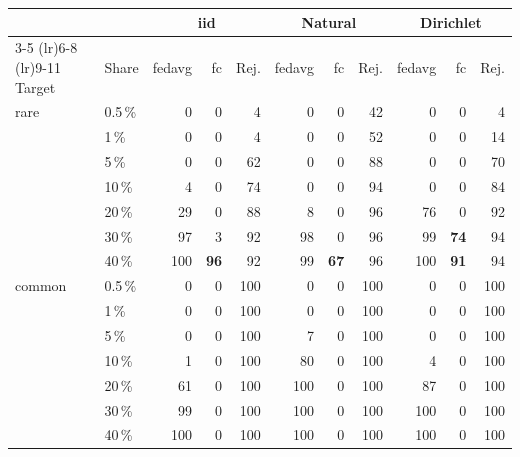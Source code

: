 \begin{tabular}{llrrrrrrrrr}
\toprule
 & & \multicolumn{3}{c}{\gls{iid}} & \multicolumn{3}{c}{Natural} & \multicolumn{3}{c}{Dirichlet} \\
\cmidrule(lr){3-5} \cmidrule(lr){6-8} \cmidrule(lr){9-11}
Target & Share & \gls{fedavg} & \gls{fc} & Rej. & \gls{fedavg} & \gls{fc} & Rej. & \gls{fedavg} & \gls{fc} & Rej. \\
\midrule
rare & 0.5\,\% & 0 & 0 & 4 & 0 & 0 & 42 & 0 & 0 & 4 \\
 & 1\,\% & 0 & 0 & 4 & 0 & 0 & 52 & 0 & 0 & 14 \\
 & 5\,\% & 0 & 0 & 62 & 0 & 0 & 88 & 0 & 0 & 70 \\
 & 10\,\% & 4 & 0 & 74 & 0 & 0 & 94 & 0 & 0 & 84 \\
 & 20\,\% & 29 & 0 & 88 & 8 & 0 & 96 & 76 & 0 & 92 \\
 & 30\,\% & 97 & 3 & 92 & 98 & 0 & 96 & 99 & \textbf{74} & 94 \\
 & 40\,\% & 100 & \textbf{96} & 92 & 99 & \textbf{67} & 96 & 100 & \textbf{91} & 94 \\
\midrule
common & 0.5\,\% & 0 & 0 & 100 & 0 & 0 & 100 & 0 & 0 & 100 \\
 & 1\,\% & 0 & 0 & 100 & 0 & 0 & 100 & 0 & 0 & 100 \\
 & 5\,\% & 0 & 0 & 100 & 7 & 0 & 100 & 0 & 0 & 100 \\
 & 10\,\% & 1 & 0 & 100 & 80 & 0 & 100 & 4 & 0 & 100 \\
 & 20\,\% & 61 & 0 & 100 & 100 & 0 & 100 & 87 & 0 & 100 \\
 & 30\,\% & 99 & 0 & 100 & 100 & 0 & 100 & 100 & 0 & 100 \\
 & 40\,\% & 100 & 0 & 100 & 100 & 0 & 100 & 100 & 0 & 100 \\
\bottomrule
\end{tabular}
